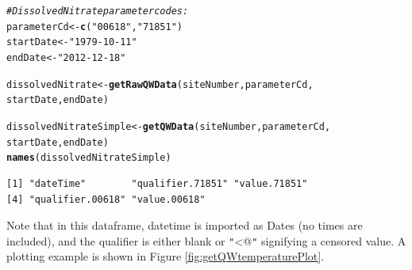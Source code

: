 \documentclass[a4paper,11pt]{article}\usepackage[]{graphicx}\usepackage[]{color}
\makeatletter
\newcommand{\hlstr}[1]{\textcolor[rgb]{0.192,0.494,0.8}{#1}}%
\newcommand{\hlcom}[1]{\textcolor[rgb]{0.678,0.584,0.686}{\textit{#1}}}%
\newcommand{\hlstd}[1]{\textcolor[rgb]{0.345,0.345,0.345}{#1}}%
\newcommand{\hlkwb}[1]{\textcolor[rgb]{0.69,0.353,0.396}{#1}}%
\newcommand{\hlkwd}[1]{\textcolor[rgb]{0.737,0.353,0.396}{\textbf{#1}}}%
\newenvironment{kframe}{%
 \def\at@end@of@kframe{}%
 \ifinner\ifhmode%
  \def\at@end@of@kframe{\end{minipage}}%
  \begin{minipage}{\columnwidth}%
 \fi\fi%
 \def\FrameCommand##1{\hskip\@totalleftmargin \hskip-\fboxsep
 \colorbox{shadecolor}{##1}\hskip-\fboxsep
     \hskip-\linewidth \hskip-\@totalleftmargin \hskip\columnwidth}%
 \MakeFramed {\advance\hsize-\width
   \@totalleftmargin\z@ \linewidth\hsize
   \@setminipage}}%
 {\par\unskip\endMakeFramed%
 \at@end@of@kframe}
\newenvironment{knitrout}{}{} %
\makeatother
\begin{document}
\begin{knitrout}
\color{fgcolor}\begin{kframe}
\begin{alltt}
\hlcom{# Dissolved Nitrate parameter codes:}
\hlstd{parameterCd} \hlkwb{<-} \hlkwd{c}\hlstd{(}\hlstr{"00618"}\hlstd{,}\hlstr{"71851"}\hlstd{)}
\hlstd{startDate} \hlkwb{<-} \hlstr{"1979-10-11"}
\hlstd{endDate} \hlkwb{<-} \hlstr{"2012-12-18"}

\hlstd{dissolvedNitrate} \hlkwb{<-} \hlkwd{getRawQWData}\hlstd{(siteNumber, parameterCd,}
      \hlstd{startDate, endDate)}

\hlstd{dissolvedNitrateSimple} \hlkwb{<-} \hlkwd{getQWData}\hlstd{(siteNumber, parameterCd,}
        \hlstd{startDate, endDate)}
\hlkwd{names}\hlstd{(dissolvedNitrateSimple)}
\end{alltt}
\begin{verbatim}
[1] "dateTime"        "qualifier.71851" "value.71851"    
[4] "qualifier.00618" "value.00618"    
\end{verbatim}
\end{kframe}
\end{knitrout}

Note that in this dataframe, datetime is imported as Dates (no times are included), and the qualifier is either blank or \texttt{"}\verb@<@\texttt{"} signifying a censored value. A plotting example is shown in Figure \ref{fig:getQWtemperaturePlot}.
\end{document}
